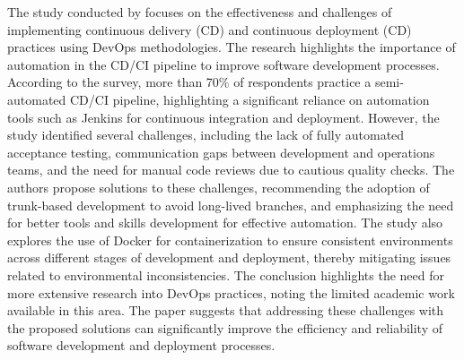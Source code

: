 The study conducted by \citet{agarwalContinuousIntegratedSoftware2018} focuses on the effectiveness and challenges of implementing continuous delivery (CD) and continuous deployment (CD) practices using DevOps methodologies.
The research highlights the importance of automation in the CD/CI pipeline to improve software development processes.
According to the survey, more than 70\% of respondents practice a semi-automated CD/CI pipeline, highlighting a significant reliance on automation tools such as Jenkins for continuous integration and deployment.
However, the study identified several challenges, including the lack of fully automated acceptance testing, communication gaps between development and operations teams, and the need for manual code reviews due to cautious quality checks.
The authors propose solutions to these challenges, recommending the adoption of trunk-based development to avoid long-lived branches, and emphasizing the need for better tools and skills development for effective automation.
The study also explores the use of Docker for containerization to ensure consistent environments across different stages of development and deployment, thereby mitigating issues related to environmental inconsistencies.
The conclusion highlights the need for more extensive research into DevOps practices, noting the limited academic work available in this area.
The paper suggests that addressing these challenges with the proposed solutions can significantly improve the efficiency and reliability of software development and deployment processes.

